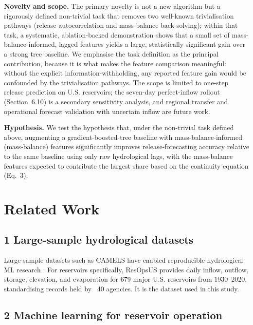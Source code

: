 \documentclass[journal]{ascelike-new}
\begin{document}
\textbf{Novelty and scope.} The primary novelty is not a new algorithm but a rigorously defined non-trivial task that removes two well-known trivialisation pathways (release autocorrelation and mass-balance back-solving); within that task, a systematic, ablation-backed demonstration shows that a small set of mass-balance-informed, lagged features yields a large, statistically significant gain over a strong tree baseline. We emphasise the task definition as the principal contribution, because it is what makes the feature comparison meaningful: without the explicit information-withholding, any reported feature gain would be confounded by the trivialisation pathways. The scope is limited to one-step release prediction on U.S. reservoirs; the seven-day perfect-inflow rollout (Section~6.10) is a secondary sensitivity analysis, and regional transfer and operational forecast validation with uncertain inflow are future work.


\textbf{Hypothesis.} We test the hypothesis that, under the non-trivial task defined above, augmenting a gradient-boosted-tree baseline with mass-balance-informed (mass-balance) features significantly improves release-forecasting accuracy relative to the same baseline using only raw hydrological lags, with the mass-balance features expected to contribute the largest share based on the continuity equation (Eq.~3).



\section{Related Work}


\subsection{1 Large-sample hydrological datasets}


Large-sample datasets such as CAMELS \citep{Addor2017} have enabled reproducible hydrological ML research \citep{Kratzert2018}. For reservoirs specifically, ResOpsUS \citep{Steyaert2022} provides daily inflow, outflow, storage, elevation, and evaporation for 679 major U.S. reservoirs from 1930--2020, standardising records held by ~40 agencies. It is the dataset used in this study.


\subsection{2 Machine learning for reservoir operation}
\end{document}
